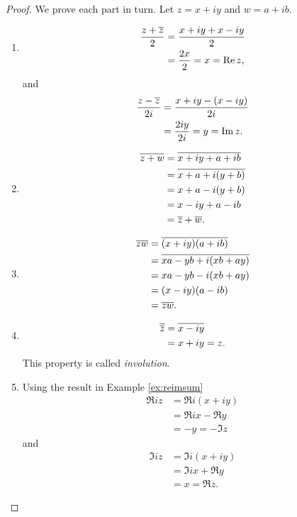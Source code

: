 \begin{proof}
    We prove each part in turn. Let \(z = x + iy\) and \(w = a + ib\).

    \begin{enumerate}[label=(\alph*)]
        \item \[
            \begin{aligned}
                \frac{z + \overline{z}}{2} &= \frac{x + iy + x - iy}{2} \\
                &= \frac{2x}{2} = x = \operatorname{Re} z,
            \end{aligned}
        \]
        and
        \[
            \begin{aligned}
                \frac{z - \overline{z}}{2i} &= \frac{x + iy - (x - iy)}{2i} \\
                &= \frac{2iy}{2i} = y = \operatorname{Im} z.
            \end{aligned}
        \]
        \item \[ 
            \begin{aligned}
                \overline{z + w} &= \overline{x + iy + a + ib} \\
                &= \overline{x + a + i(y + b)} \\
                &= x + a - i(y + b) \\
                &= x - iy + a - ib \\
                &= \overline{z} + \overline{w}.
            \end{aligned}
        \]
        \item \[
            \begin{aligned}
                \overline{zw} &= \overline{(x + iy)(a + ib)} \\
                &= \overline{xa - yb + i(xb + ay)} \\
                &= xa - yb - i(xb + ay) \\
                &= (x - iy)(a - ib) \\
                &= \overline{z}\overline{w}.
            \end{aligned}
        \]
        \item \[
            \begin{aligned}
                \overline{\overline{z}} &= \overline{x - iy} \\
                &= x + iy = z.
            \end{aligned}
        \]
        This property is called \emph{involution}.
        \item Using the result in Example \ref{ex:reimsum}
        \[
            \begin{aligned}
                \Re iz &= \Re i(x + iy) \\
                &= \Re ix - \Re y \\
                &= -y = -\Im z
            \end{aligned}
        \]
        and
        \[
            \begin{aligned}
                \Im iz &= \Im i(x + iy) \\
                &= \Im ix + \Re y \\
                &= x = \Re z.
            \end{aligned}
        \]
    \end{enumerate}


\end{proof}

